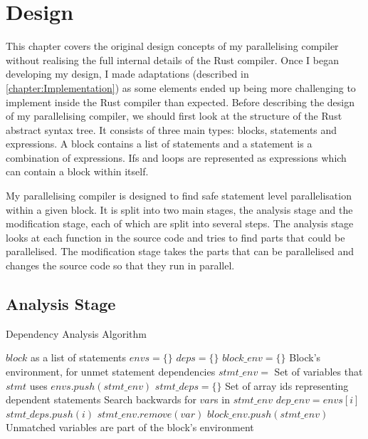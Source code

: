 \chapter{Design}
\label{chapter:Design}
This chapter covers the original design concepts of my parallelising compiler without realising the full internal details of the Rust compiler. Once I began developing my design, I made adaptations (described in \autoref{chapter:Implementation}) as some elements ended up being more challenging to implement inside the Rust compiler than expected.
Before describing the design of my parallelising compiler, we should first look at the structure of the Rust abstract syntax tree. It consists of three main types: blocks, statements and expressions. A block contains a list of statements and a statement is a combination of expressions. Ifs and loops are represented as expressions which can contain a block within itself.

My parallelising compiler is designed to find safe statement level parallelisation within a given block. It is split into two main stages, the analysis stage and the modification stage, each of which are split into several steps. The analysis stage looks at each function in the source code and tries to find parts that could be parallelised. The modification stage takes the parts that can be parallelised and changes the source code so that they run in parallel.

\section{Analysis Stage}
\begin{algorithm}[H]
\caption{Dependency Analysis Algorithm}
\label{alg:dependency-analysis}
\begin{algorithmic}[1]
    \Require $block$ as a list of statements
    \State $envs = \{\}$
    \State $deps = \{\}$
    \State $block\_env = \{\}$ \Comment Block's environment, for unmet statement dependencies
        \State $stmt\_env =$ Set of variables that $stmt$ uses
        \State $envs.push(stmt\_env)$
        \State $stmt\_deps = \{\}$ \Comment Set of array ids representing dependent statements
         \Comment Search backwards for $var$s in $stmt\_env$
            \State $dep\_env = envs[i]$
                \State $stmt\_deps.push(i)$
                \State $stmt\_env.remove(var)$
            \EndFor
        \EndFor
        \State $block\_env.push(stmt\_env)$ \Comment Unmatched variables are part of the block's environment
    \EndFor
\end{algorithmic}
\end{algorithm}

